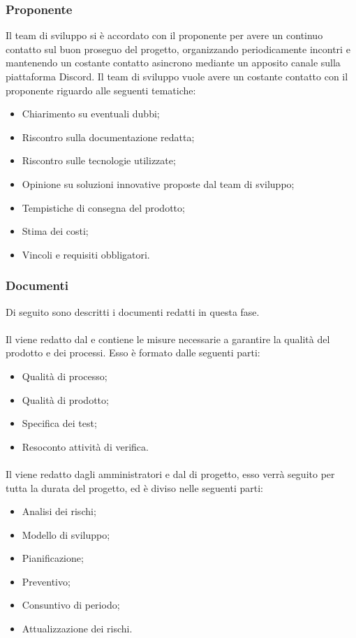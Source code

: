 \subsubsection{Proponente}\label{subsubsection: proponente_fornitura}
Il team di sviluppo si è accordato con il proponente per avere un continuo contatto sul buon proseguo del progetto, organizzando periodicamente incontri e mantenendo un costante contatto asincrono mediante un apposito canale sulla piattaforma Discord\glo{}.
Il team di sviluppo vuole avere un costante contatto con il proponente riguardo alle seguenti tematiche:
\begin {itemize}
\item Chiarimento su eventuali dubbi;
\item Riscontro sulla documentazione redatta;
\item Riscontro sulle tecnologie utilizzate;
\item Opinione su soluzioni innovative proposte dal team di sviluppo;
\item Tempistiche di consegna del prodotto;
\item Stima dei costi;
\item Vincoli e requisiti obbligatori.
\end{itemize}
\subsubsection {Documenti}\label{subsubsection: documenti_fornitura}
Di seguito sono descritti i documenti redatti in questa fase.
\paragraph{\docNamePdQ{}}\label{paragraph: PdQ_fornitura}
Il \docNamePdQLow{} viene redatto dal \roleVerifierLow{} e contiene le misure necessarie a garantire la qualità del prodotto e dei processi.
Esso è formato dalle seguenti parti:
\begin{itemize}
    \item Qualità di processo;
    \item Qualità di prodotto;
    \item Specifica dei test;
    \item Resoconto attività di verifica.
\end{itemize}
\paragraph{\docNamePdP{}}\label{paragraph: PdP_fornitura}
Il \docNamePdPLow{} viene redatto dagli amministratori e dal \roleProjectManagerLow{} di progetto, esso verrà seguito per tutta la durata del progetto, ed è diviso nelle seguenti parti:
\begin{itemize}
    \item Analisi dei rischi;
    \item Modello di sviluppo;
    \item Pianificazione;
    \item Preventivo;
    \item Consuntivo di periodo;
    \item Attualizzazione dei rischi.
\end{itemize}
